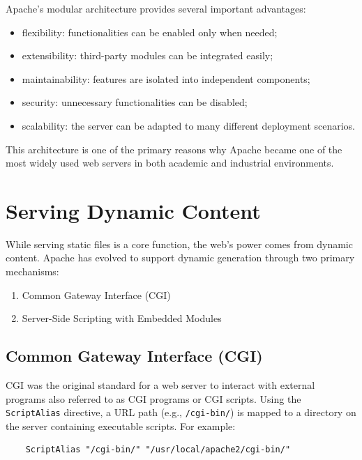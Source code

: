 \documentclass{scrbook}
\begin{document}
	Apache's modular architecture provides several important advantages:
	
	\begin{itemize}
		\item flexibility: functionalities can be enabled only when needed;
		
		\item extensibility: third-party modules can be integrated easily;
		
		\item maintainability: features are isolated into independent components;
		
		\item security: unnecessary functionalities can be disabled;
		
		\item scalability: the server can be adapted to many different deployment scenarios.
	\end{itemize}
	
	This architecture is one of the primary reasons why Apache became one of the most widely used web servers in both academic and industrial environments.
	
	\section{Serving Dynamic Content}
	
	While serving static files is a core function, the web's power comes from dynamic content.
	Apache has evolved to support dynamic generation through two primary mechanisms:
	\begin{enumerate}
		\item Common Gateway Interface (CGI)
		\item Server-Side Scripting with Embedded Modules
	\end{enumerate}
	
	
	\subsection{Common Gateway Interface (CGI)}
	CGI was the original standard for a web server to interact with external programs also referred to as CGI programs or CGI scripts. Using the \texttt{ScriptAlias} directive, a URL path (e.g., \texttt{/cgi-bin/}) is mapped to a directory on the server containing executable scripts. For example:
	        
	\begin{lstlisting}
	ScriptAlias "/cgi-bin/" "/usr/local/apache2/cgi-bin/"
	\end{lstlisting}
	        
\end{document}
